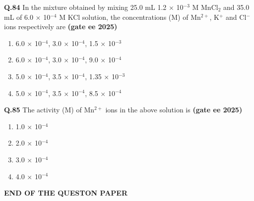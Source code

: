 \documentclass[journal,12pt,onecolumn]{exam}
\theoremstyle{remark}
\begin{document}
\noindent \textbf{Q.84} In the mixture obtained by mixing 25.0 mL 1.2 $\times$ 10$^{-3}$ M MnCl$_2$ and 35.0 mL of 6.0 $\times$ 10$^{-4}$ M KCl solution, the concentrations (M) of Mn$^{2+}$, K$^+$ and Cl$^-$ ions respectively are \hfill{\textbf{(gate ee 2025)}}
\begin{multicols}{2}
\begin{enumerate}[label=(\Alph*)]
    \item 6.0 $\times$ 10$^{-4}$, 3.0 $\times$ 10$^{-4}$, 1.5 $\times$ 10$^{-3}$
    \item 6.0 $\times$ 10$^{-4}$, 3.0 $\times$ 10$^{-4}$, 9.0 $\times$ 10$^{-4}$
    \item 5.0 $\times$ 10$^{-4}$, 3.5 $\times$ 10$^{-4}$, 1.35 $\times$ 10$^{-3}$
    \item 5.0 $\times$ 10$^{-4}$, 3.5 $\times$ 10$^{-4}$, 8.5 $\times$ 10$^{-4}$
\end{enumerate}
\end{multicols}
\vspace{0.5cm}
\noindent \textbf{Q.85} The activity (M) of Mn$^{2+}$ ions in the above solution is \hfill{\textbf{(gate ee 2025)}}
\begin{multicols}{2}
\begin{enumerate}[label=(\Alph*)]
    \item 1.0 $\times$ 10$^{-4}$
    \item 2.0 $\times$ 10$^{-4}$
    \item 3.0 $\times$ 10$^{-4}$
    \item 4.0 $\times$ 10$^{-4}$
\end{enumerate}
\end{multicols}
\vspace{0.5cm}
\begin{center}
    \textbf{END OF THE QUESTON PAPER}
\end{center}
\end{document}
